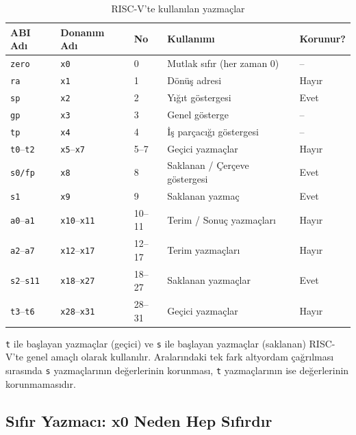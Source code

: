 \begin{table}[H]
\centering
\caption{RISC-V'te kullanılan yazmaçlar}
\label{tab:riscv-yazmaclar}
\small
\begin{tabular}{lllp{5.5cm}l}
\toprule
\textbf{ABI Adı} & \textbf{Donanım Adı} & \textbf{No} & \textbf{Kullanımı} & \textbf{Korunur?} \\
\midrule
\texttt{zero}      & \texttt{x0}      & 0     & Mutlak sıfır (her zaman 0)       & -- \\
\texttt{ra}        & \texttt{x1}      & 1     & Dönüş adresi                     & Hayır \\
\texttt{sp}        & \texttt{x2}      & 2     & Yığıt göstergesi                 & Evet \\
\texttt{gp}        & \texttt{x3}      & 3     & Genel gösterge                   & -- \\
\texttt{tp}        & \texttt{x4}      & 4     & İş parçacığı göstergesi          & -- \\
\texttt{t0}--\texttt{t2} & \texttt{x5}--\texttt{x7} & 5--7  & Geçici yazmaçlar          & Hayır \\
\texttt{s0/fp}     & \texttt{x8}      & 8     & Saklanan / Çerçeve göstergesi    & Evet \\
\texttt{s1}        & \texttt{x9}      & 9     & Saklanan yazmaç                  & Evet \\
\texttt{a0}--\texttt{a1} & \texttt{x10}--\texttt{x11} & 10--11 & Terim / Sonuç yazmaçları & Hayır \\
\texttt{a2}--\texttt{a7} & \texttt{x12}--\texttt{x17} & 12--17 & Terim yazmaçları         & Hayır \\
\texttt{s2}--\texttt{s11} & \texttt{x18}--\texttt{x27} & 18--27 & Saklanan yazmaçlar      & Evet \\
\texttt{t3}--\texttt{t6} & \texttt{x28}--\texttt{x31} & 28--31 & Geçici yazmaçlar        & Hayır \\
\bottomrule
\end{tabular}
\end{table}

\texttt{t} ile başlayan yazmaçlar (geçici) ve \texttt{s} ile başlayan yazmaçlar (saklanan) RISC-V'te genel amaçlı olarak kullanılır. Aralarındaki tek fark altyordam çağrılması sırasında \texttt{s} yazmaçlarının değerlerinin korunması, \texttt{t} yazmaçlarının ise değerlerinin korunmamasıdır.

\subsection{Sıfır Yazmacı: x0 Neden Hep Sıfırdır}

